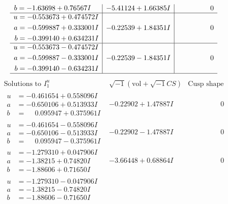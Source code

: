 \documentclass[1p]{elsarticle_modified}
\theoremstyle{definition}
\newcommand{\I}{\sqrt{-1}}
\begin{document}
$$\begin{array}{c|c|c}
\begin{aligned}
b &= -1.63698 + 0.76567 I\end{aligned}
 & -5.41124 + 1.66385 I & \phantom{-0.000000 } 0 \\ \hline\begin{aligned}
u &= -0.553673 + 0.474572 I \\
a &= -0.599887 + 0.333001 I \\
b &= -0.399140 + 0.634231 I\end{aligned}
 & -0.22539 + 1.84351 I & \phantom{-0.000000 } 0 \\ \hline\begin{aligned}
u &= -0.553673 - 0.474572 I \\
a &= -0.599887 - 0.333001 I \\
b &= -0.399140 - 0.634231 I\end{aligned}
 & -0.22539 - 1.84351 I & \phantom{-0.000000 } 0\\
 \hline 
 \end{array}$$\newpage$$\begin{array}{c|c|c}  
\text{Solutions to }I^u_{1}& \I (\text{vol} + \sqrt{-1}CS) & \text{Cusp shape}\\
 \hline 
\begin{aligned}
u &= -0.461654 + 0.558096 I \\
a &= -0.650106 + 0.513933 I \\
b &= \phantom{-}0.095947 + 0.375961 I\end{aligned}
 & -0.22902 + 1.47887 I & \phantom{-0.000000 } 0 \\ \hline\begin{aligned}
u &= -0.461654 - 0.558096 I \\
a &= -0.650106 - 0.513933 I \\
b &= \phantom{-}0.095947 - 0.375961 I\end{aligned}
 & -0.22902 - 1.47887 I & \phantom{-0.000000 } 0 \\ \hline\begin{aligned}
u &= -1.279310 + 0.047906 I \\
a &= -1.38215 + 0.74820 I \\
b &= -1.88606 + 0.71650 I\end{aligned}
 & -3.66448 + 0.68864 I & \phantom{-0.000000 } 0 \\ \hline\begin{aligned}
u &= -1.279310 - 0.047906 I \\
a &= -1.38215 - 0.74820 I \\
b &= -1.88606 - 0.71650 I\end{aligned}

\end{array}$$
\end{document}
